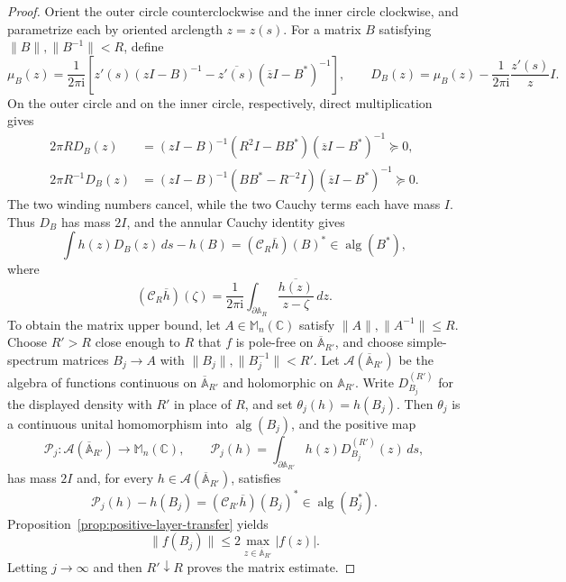 \documentclass[preprints,article,submit,oneauthor]{Definitions/mdpi}
\theoremstyle{mdpi}
\theoremstyle{definition}
\newcommand{\C}{\mathbb C}
\newcommand{\Mn}{\mathbb M_n(\C)}
\newcommand{\alg}{\operatorname{alg}}
\newcommand{\iu}{\mathrm{i}}
\begin{document}
\begin{proof}
Orient the outer circle counterclockwise and the inner circle
clockwise, and parametrize each by oriented arclength $z=z(s)$.  For
a matrix $B$ satisfying
$\lVert B\rVert,\lVert B^{-1}\rVert<R$, define
\[
  \mu_B(z)=\frac1{2\pi\iu}\left[
  z'(s)(zI-B)^{-1}
  -\overline{z'(s)}(\overline zI-B^*)^{-1}\right],
  \qquad
  D_B(z)=\mu_B(z)-\frac1{2\pi\iu}\frac{z'(s)}zI.
\]
On the outer circle and on the inner circle, respectively, direct
multiplication gives
\begin{align}
  2\pi R D_B(z)
  &=(zI-B)^{-1}(R^2I-BB^*)
    (\overline zI-B^*)^{-1}\succeq0,\nonumber\\
  2\pi R^{-1}D_B(z)
  &=(zI-B)^{-1}(BB^*-R^{-2}I)
    (\overline zI-B^*)^{-1}\succeq0.
  \label{eq:annular-readiness-factorizations}
\end{align}
The two winding numbers cancel, while the two Cauchy terms each have
mass $I$.  Thus $D_B$ has mass $2I$, and the annular Cauchy identity
gives
\[
  \int h(z)D_B(z)\,ds-h(B)
  =(\mathcal C_R\overline h)(B)^*\in\alg(B^*),
\]
where
\[
 (\mathcal C_R\overline h)(\zeta)
 =\frac1{2\pi\iu}\int_{\partial\mathbb A_R}
   \frac{\overline{h(z)}}{z-\zeta}\,dz.
\]
To obtain the matrix upper bound, let $A\in\Mn$ satisfy
$\lVert A\rVert,\lVert A^{-1}\rVert\leq R$.  Choose $R'>R$ close
enough to $R$ that $f$ is pole-free on
$\overline{\mathbb A}_{R'}$, and choose simple-spectrum matrices
$B_j\to A$ with
$\lVert B_j\rVert,\lVert B_j^{-1}\rVert<R'$.  Let
$\mathcal A(\overline{\mathbb A}_{R'})$ be the algebra of functions continuous
on $\overline{\mathbb A}_{R'}$ and holomorphic on
$\mathbb A_{R'}$.  Write $D_{B_j}^{(R')}$ for the displayed density
with $R'$ in place of $R$, and set
$\theta_j(h)=h(B_j)$.  Then $\theta_j$ is a continuous unital
homomorphism into $\alg(B_j)$, and the positive map
\[
  \mathcal P_j\colon \mathcal A(\overline{\mathbb A}_{R'})
  \longrightarrow\Mn,\qquad
  \mathcal P_j(h)=
  \int_{\partial\mathbb A_{R'}}h(z)D_{B_j}^{(R')}(z)\,ds,
\]
has mass $2I$ and, for every
$h\in\mathcal A(\overline{\mathbb A}_{R'})$, satisfies
\[
  \mathcal P_j(h)-h(B_j)
  =(\mathcal C_{R'}\overline h)(B_j)^*\in\alg(B_j^*).
\]
Proposition~\ref{prop:positive-layer-transfer} yields
\[
  \lVert f(B_j)\rVert\leq2
  \max_{z\in\overline{\mathbb A}_{R'}}\lvert f(z)\rvert.
\]
Letting $j\to\infty$ and then $R'\downarrow R$ proves the matrix
estimate.


\end{proof}
\end{document}
